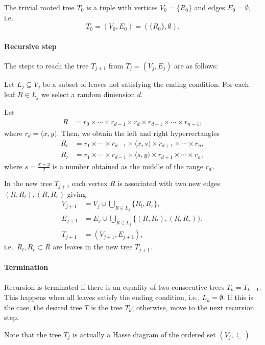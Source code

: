The trivial rooted tree \(T_0\) is a tuple with
vertices \(V_0 = \{R_0\}\) and edges \(E_0 = \emptyset\), i.e.
\[T_0= (V_0, E_0) = (\{R_0\},\emptyset).\]

\paragraph{Recursive step}
The steps to reach the tree \(T_{j+1}\) from \(T_{j} = (V_j, E_j)\) are
as follows:

Let \(L_j \subseteq V_j\) be a subset of leaves not satisfying the
ending condition.
For each leaf \(R \in L_j\) we
select a random dimension \(d\).

Let
\begin{align*}
R &= r_0 \times  \cdots \times r_{d-1} \times  r_d\times r_{d+1} \times \cdots \times r_{n-1},
\end{align*}
where $r_d = \langle x, y )$.
Then, we obtain the left and right hyperrectangles
\begin{align*}
R_l &= r_1 \times  \cdots \times r_{d-1} \times  \langle x, s ) \times r_{d+1} \times \cdots \times r_n, \\
R_r &= r_1 \times  \cdots \times r_{d-1} \times \langle s, y ) \times r_{d+1} \times \cdots \times r_n,
\end{align*}
where \(s = \frac{x + y}{2}\) is a number obtained as the middle of the range \(r_d\,\).

In the new tree $T_{j+1}$ each vertex \(R\) is associated with two new
edges \((R,R_l ), (R, R_r)\) giving
\begin{align*}
V_{j+1} &= V_j \cup \bigcup_{R \in L_j} \{R_l, R_r\},\\
E_{j+1} &= E_j \cup \bigcup_{R \in L_j} \{(R, R_l), (R,R_r)\},\\
T_{j+1} &= (V_{j+1}, E_{j+1}),
\end{align*}
i.e.~${R_l, R_r} \subset R$ are leaves in the new tree
\(T_{j+1}\).

\paragraph{Termination} Recursion is terminated if there is an equality of two consecutive trees \(T_k = T_{k+1}\). This happens when all leaves satisfy the ending condition, i.e., \(L_k = \emptyset\).
If this is the case, the desired tree $T$ is the tree $T_k$; otherwise, move to the next recursion step.


Note that the tree \(T_{j}\) is actually a Hasse diagram of the ordered set
\((V_j,\subseteq)\).


